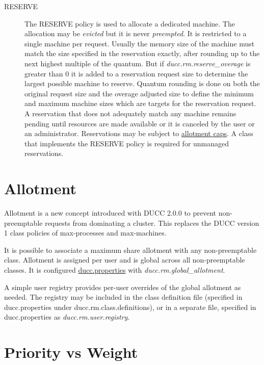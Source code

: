 \begin{description}
        \item[RESERVE] The RESERVE policy is used to allocate a dedicated machine.
          The allocation may be {\em evicted} but it is never {\em preempted}. It is
          restricted to a single machine per request.  Usually the memory size
          of the machine must match the size specified in the reservation 
          exactly, after rounding up to the next highest multiple of the quantum.
          But if {\em ducc.rm.reserve\_overage} is greater than 0 it is added to a reservation 
          request size to determine the largest possible machine to reserve. 
          Quantum rounding is done on both the original request size and the overage adjusted size
          to define the minimum and maximum machine sizes which are targets for the reservation request.
          A reservation that does not adequately match any
          machine remains pending until resources are made available or it is 
          canceled by the user or an administrator. Reservations may be
          subject to \hyperref[sec:rm.allotment]{allotment caps}.
          A class that implements the RESERVE policy is required for unmanaged reservations.

    \end{description}
    
    \section{Allotment}
    \label{sec:rm.allotment}
    
    Allotment is a new concept introduced with DUCC 2.0.0 to prevent non-preemptable 
    requests from dominating a cluster.  This replaces the DUCC version 1 class
    policies of max-processes and max-machines.

    It is possible to associate a maximum share allotment with any non-preemptable class. 
    Allotment is assigned per user and is global across all non-preemptable classes.  It is configured
    \hyperref[sec:ducc.properties]{ducc.properties} with {\em ducc.rm.global\_allotment}.  

    A simple user registry provides per-user overrides of the global allotment as needed.  The
    registry may be included in the class definition file (specified in ducc.properties under
    ducc.rm.class.definitions), or in a separate file, specified in ducc.properties as
    {\em ducc.rm.user.registry}.


    \section{Priority vs Weight}

